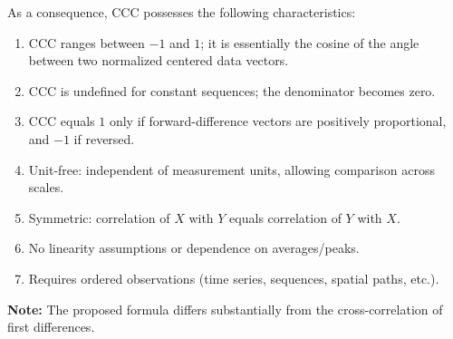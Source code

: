 \documentclass[aos]{imsart}
\begin{document}
As a consequence, CCC possesses the following characteristics:
\begin{enumerate}
\item[\,(\text{I})] CCC ranges between $-1$ and $1$; it is essentially the cosine of the angle between two normalized centered data vectors.
\item[\,(\text{II})] CCC is undefined for constant sequences; the denominator becomes zero.
\item[\,(\text{III})] CCC equals $1$ only if forward-difference vectors are positively proportional, and $-1$ if reversed.
\item[\,(\text{IV})] Unit-free: independent of measurement units, allowing comparison across scales.
\item[\,(\text{V})] Symmetric: correlation of $X$ with $Y$ equals correlation of $Y$ with $X$.
\item[\,(\text{VI})] No linearity assumptions or dependence on averages/peaks.
\item[\,(\text{VII})] Requires ordered observations (time series, sequences, spatial paths, etc.).
\end{enumerate}

\textbf{Note:} The proposed formula differs substantially from the cross-correlation of first differences.



%
%
\end{document}
